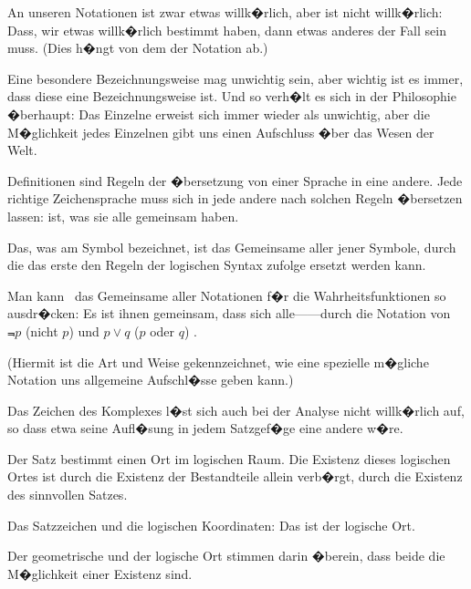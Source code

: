 \begin{propositions}
{An unseren Notationen ist zwar etwas willk�rlich,
aber  ist nicht willk�rlich: Dass,  wir
etwas willk�rlich bestimmt haben, dann etwas
anderes der Fall sein muss. (Dies h�ngt von dem
 der Notation ab.)}


{{\stretchyspace
Eine besondere Bezeichnungsweise mag unwichtig
sein, aber wichtig ist es immer, dass diese
eine  Bezeichnungsweise ist. Und so
verh�lt es sich in der Philosophie �berhaupt: Das
Einzelne erweist sich immer wieder als unwichtig,
aber die M�glichkeit jedes Einzelnen gibt uns
einen Aufschluss �ber das Wesen der Welt.}}


{Definitionen sind Regeln der �bersetzung von
einer Sprache in eine andere. Jede richtige Zeichensprache
muss sich in jede andere nach solchen
Regeln �bersetzen lassen:  ist, was sie alle
gemeinsam haben.}


{Das, was am Symbol bezeichnet, ist das Gemeinsame
aller jener Symbole, durch die das erste den
Regeln der logischen Syntax zufolge ersetzt werden
kann.}


{Man kann \zumBeispiel\ das Gemeinsame aller Notationen
f�r die Wahrheitsfunktionen so ausdr�cken: Es ist
ihnen gemeinsam, dass sich alle---\zumBeispiel---durch die
Notation von \glqq{}$\Not{p}$\grqq{} (\glqq{}nicht $p$\grqq{}) und \glqq{}$p \lor q$\grqq{} (\glqq{}$p$ oder $q$\grqq{})
.

{\stretchyspace
(Hiermit ist die Art und Weise gekennzeichnet,
wie eine spezielle m�gliche Notation uns allgemeine
Aufschl�sse geben kann.)}}


{Das Zeichen des Komplexes l�st sich auch bei
der Analyse nicht willk�rlich auf, so dass etwa seine
Aufl�sung in jedem Satzgef�ge eine andere w�re.}


{Der Satz bestimmt einen Ort im logischen Raum.
Die Existenz dieses logischen Ortes ist durch die
Existenz der Bestandteile allein verb�rgt, durch die
Existenz des sinnvollen Satzes.}


{Das Satzzeichen und die logischen Koordinaten:
\enlargethispage{1pt} %
Das ist der logische Ort.}


{Der geometrische und der logische Ort stimmen
darin �berein, dass beide die M�glichkeit einer
Existenz sind.}



\end{propositions}
